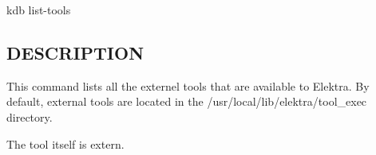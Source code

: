 {\ttfamily kdb list-\/tools}

\subsection*{D\+E\+S\+C\+R\+I\+P\+T\+I\+O\+N}

This command lists all the externel tools that are available to Elektra. By default, external tools are located in the {\ttfamily /usr/local/lib/elektra/tool\+\_\+exec} directory.

The tool itself is extern. 